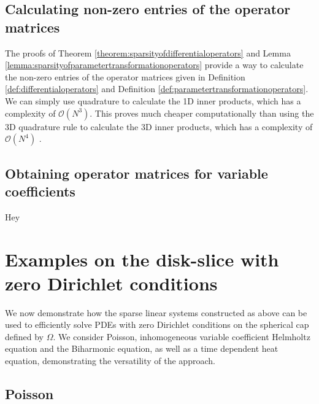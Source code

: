 \documentclass[11pt, oneside]{article}   	%
\newcommand{\bstodo}{\todo[color=pink]}
\newcommand{\bigO}{\mathcal{O}}
\begin{document}
\subsection{Calculating non-zero entries of the operator matrices}\label{subsection:Computation-operatormatrices}

The proofs of Theorem \ref{theorem:sparsityofdifferentialoperators} and Lemma \ref{lemma:sparsityofparametertransformationoperators} provide a way to calculate the non-zero entries of the operator matrices given in Definition \ref{def:differentialoperators} and Definition \ref{def:parametertransformationoperators}. We can simply use quadrature to calculate the 1D inner products, which has a complexity of $\bigO(N^3)$. This proves much cheaper computationally than using the 3D quadrature rule to calculate the 3D inner products, which has a complexity of $\bigO(N^4)$ \bstodo{correct the O(nd) complexity}. 


\subsection{Obtaining operator matrices for variable coefficients}\label{subsection:operatorclenshaw}

Hey



%
\section{Examples on the disk-slice with zero Dirichlet conditions}\label{Section:Examples}

We now demonstrate how the sparse linear systems constructed as above can be used to efficiently solve PDEs with zero Dirichlet conditions on the spherical cap defined by $\Omega$. We consider Poisson, inhomogeneous variable coefficient Helmholtz equation and the Biharmonic equation, as well as a time dependent heat equation, demonstrating the versatility of the approach.

\subsection{Poisson}
\end{document}
